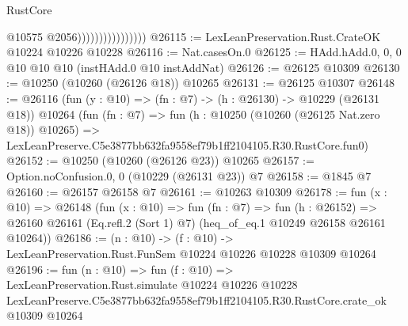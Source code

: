 \begin{lexlean}{RustCore}
\begin{coremodule}
                                    @10575
                                    @2056))))))))))))))))
@26115 := LexLeanPreservation.Rust.CrateOK @10224 @10226 @10228
@26116 := Nat.casesOn.{0}
@26125 := HAdd.hAdd.{0, 0, 0} @10 @10 @10 (instHAdd.{0} @10 instAddNat)
@26126 := @26125 @10309
@26130 := @10250 (@10260 (@26126 @18)) @10265
@26131 := @26125 @10307
@26148 := @26116
    (fun (y : @10) => (fn : @7) -> (h : @26130) -> @10229 (@26131 @18))
    @10264
    (fun (fn : @7) =>
    fun (h : @10250 (@10260 (@26125 Nat.zero @18)) @10265) =>
    LexLeanPreserve.C5e3877bb632fa9558ef79b1ff2104105.R30.RustCore.fun0)
@26152 := @10250 (@10260 (@26126 @23)) @10265
@26157 := Option.noConfusion.{0, 0} (@10229 (@26131 @23)) @7
@26158 := @1845 @7
@26160 := @26157 @26158 @7
@26161 := @10263 @10309
@26178 := fun (x : @10) =>
  @26148
    (fun (x : @10) =>
    fun (fn : @7) =>
    fun (h : @26152) =>
    @26160 @26161 (Eq.refl.{2} (Sort 1) @7) (heq_of_eq.{1} @10249 @26158 @26161 @10264))
@26186 := (n : @10) ->
  (f : @10) -> LexLeanPreservation.Rust.FunSem @10224 @10226 @10228 @10309 @10264
@26196 := fun (n : @10) =>
  fun (f : @10) =>
  LexLeanPreservation.Rust.simulate
    @10224
    @10226
    @10228
    LexLeanPreserve.C5e3877bb632fa9558ef79b1ff2104105.R30.RustCore.crate_ok
    @10309
    @10264
\end{coremodule}
\end{lexlean}
